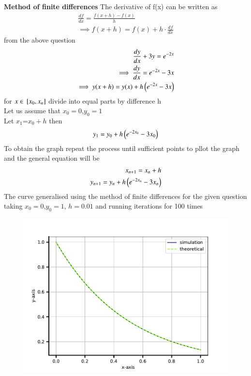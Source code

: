 \documentclass[journal]{IEEEtran}
\begin{document}
\textbf{Method of finite differences}
The derivative of f(x) can be written as 
\begin{align}
    \frac{df}{dx}=\frac{f(x+h)-f(x)}{h}\\
    \implies f(x+h)=f(x)+h\cdot\frac{df}{dx}
\end{align}
from the above question 
\begin{align}
    \frac{dy}{dx}+3y=e^{-2x}\\
    \implies \frac{dy}{dx}=e^{-2x}-3x\\
    \implies y(x+h)=y(x)+h\left(e^{-2x}-3x\right)
\end{align}
for $x \in {}\left[x_{0},x_{n}\right]$ divide into equal parts by difference h\\
Let us assume that $x_{0}=0$,$y_{0}=1$\\
Let $x_{1}$=$x_{0}+h$ then
\begin{align}
    y_{1}=y_{0}+h\left(e^{-2x_{0}}-3x_{0}\right)
\end{align}
To obtain the graph repeat the process until sufficient points to pllot the graph and the general equation will be 
\begin{align}
    x_{n+1}=x_{n}+h\\
    y_{n+1}=y_{n}+h\left(e^{-2x_{n}}-3x_{n}\right)
\end{align}
The curve generalised using the method of finite differences for the given question taking $x_{0}=0$,$y_{0}=1$, $h=0.01$ and running iterations for 100 times
\begin{figure}[h!]
   \centering
   \includegraphics[width=0.7\columnwidth]{figs/fig.pdf}
\end{figure}
\end{document}
